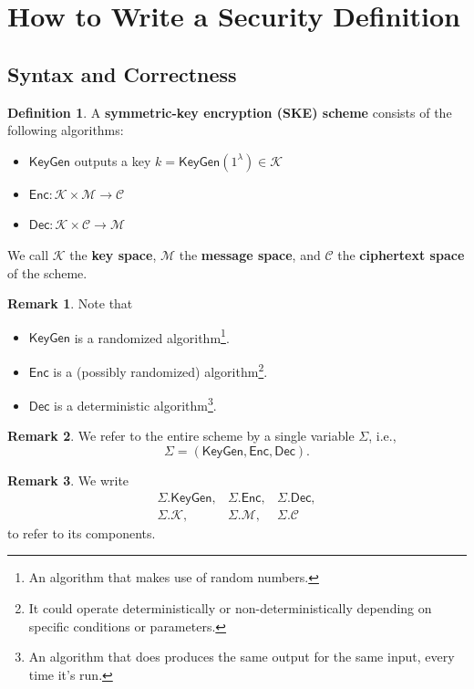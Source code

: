 \documentclass[12pt,openany]{book}
\theoremstyle{definition}
\newtheorem{definition}{Definition}[chapter]
\newtheorem{remark}{Remark}[chapter]
\newcommand{\ie}{\textnormal{i.e.}}
\newcommand{\KeyGen}{\mathsf{KeyGen}}
\newcommand{\Enc}{\mathsf{Enc}}
\newcommand{\Dec}{\mathsf{Dec}}
\newcommand{\scheme}{\Sigma}
\newcommand{\keyspace}{\mathcal{K}}
\newcommand{\messagespace}{\mathcal{M}}
\newcommand{\ciphertextspace}{\mathcal{C}}
\begin{document}
	\section{How to Write a Security Definition}
	\subsection{Syntax and Correctness}
	
	\begin{tcolorbox}[colback=white,colframe=defcolor,arc=5pt,title={\color{white}\bf Encryption Syntax}]
		\begin{definition}
			A \textbf{symmetric-key encryption (SKE) scheme} consists of the following algorithms: \begin{itemize}
				\item $\KeyGen$ outputs a key $k=\KeyGen(1^\lambda)\in\keyspace$
				\item $\Enc:\keyspace\times\messagespace\to\ciphertextspace$
				\item $\Dec:\keyspace\times\ciphertextspace\to\messagespace$
			\end{itemize} We call $\keyspace$ the \textbf{key space}, $\messagespace$ the \textbf{message space}, and $\ciphertextspace$ the \textbf{ciphertext space} of the scheme.
		\end{definition}
	\end{tcolorbox}
	\begin{remark}
		Note that \begin{itemize}
			\item \(\KeyGen\) is a randomized algorithm\footnote{An algorithm that makes use of random numbers.}.
			\item \(\Enc\) is a (possibly randomized) algorithm\footnote{It could operate deterministically or non-deterministically depending on specific conditions or parameters.}.
			\item \(\Dec\) is a deterministic algorithm\footnote{An algorithm that does produces the same output for the same input, every time it's run.}.
		\end{itemize}
	\end{remark}
	\begin{remark}
		We refer to the entire scheme by a single variable $\scheme$, \ie, $$
		\scheme=(\KeyGen, \Enc, \Dec).
		$$
	\end{remark}
	\begin{remark}
		We write \[
		\begin{array}{ccc}
			\scheme.\KeyGen, & \scheme.\Enc, & \scheme.\Dec,\\
			\scheme.\keyspace, & \scheme.\messagespace, &\scheme.\ciphertextspace
		\end{array}
		\] to refer to its components.
	\end{remark}
\end{document}
